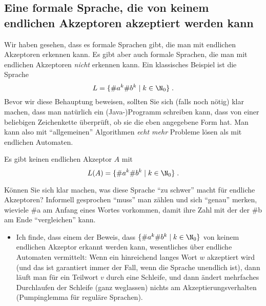 \Tut\subsection{Eine formale Sprache, die von keinem endlichen Akzeptoren akzeptiert werden kann}
\label{subsec:nicht-akzeptierbar}

Wir haben gesehen, dass es formale Sprachen gibt, die man mit
endlichen Akzeptoren erkennen kann. Es gibt aber auch formale
Sprachen, die man mit endlichen Akzeptoren \emph{nicht} erkennen
kann. Ein klassisches Beispiel ist die Sprache
\[
L = \{\#a^k\#b^k \mid k\in\N_0\} \;.
\]
%
Bevor wir diese Behauptung beweisen, sollten Sie sich (falls noch
nötig) klar machen, dass man natürlich ein (Java-)Programm schreiben
kann, dass von einer beliebigen Zeichenkette überprüft, ob sie die
eben angegebene Form hat. Man kann also mit "`allgemeinen"'
Algorithmen \emph{echt mehr} Probleme lösen als mit endlichen
Automaten.

\begin{lemma}
  Es gibt keinen endlichen Akzeptor $A$ mit
  \[
  L(A) = \{\#a^k\#b^k \mid k\in\N_0\} \;.
  \]
\end{lemma}
Können Sie sich klar machen, was diese Sprache "`zu schwer"' macht für
endliche Akzeptoren? Informell gesprochen "`muss"' man zählen und sich
"`genau"' merken, wieviele \#a am Anfang eines Wortes vorkommen, damit
ihre Zahl mit der der \#b am Ende "`vergleichen"' kann.

\begin{extract}[tut]
  \begin{itemize}
  \item Ich finde, dass einem der Beweis, dass $\{\#a^k\#b^k \mid
    k\in\N_0\}$ von keinem endlichen Akzeptor erkannt werden kann,
    wesentliches über endliche Automaten vermittelt: Wenn ein
    hinreichend langes Wort $w$ akzeptiert wird (und das ist
    garantiert immer der Fall, wenn die Sprache unendlich ist), dann
    läuft man für ein Teilwort $v$ durch eine Schleife, und dann
    ändert mehrfaches Durchlaufen der Schleife (\bzw ganz weglassen)
    nichts am Akzeptierungsverhalten (Pumpinglemma für reguläre
    Sprachen).
  \end{itemize}
\end{extract}

